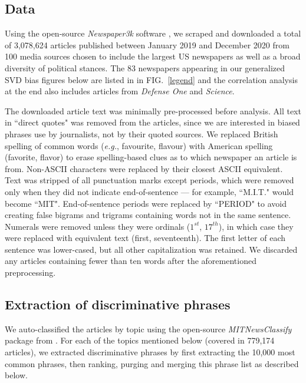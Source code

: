 \documentclass[10pt,letterpaper]{article}
\def\eg{{\frenchspacing\it e.g.}}
\def\fig#1{FIG.~\ref{#1}}
\begin{document}
\label{method}
\subsection*{Data} \label{data}

Using the open-source {\it Newspaper3k} software \cite{ou-yang_newspaper3k_nodate}, we scraped and downloaded a total of 3,078,624 articles published between January 2019 and December 2020 from 100 media sources chosen to include the largest US newspapers as well as a broad diversity of political stances.
The 83 newspapers appearing in our generalized SVD bias figures below are listed in in \fig{legend} and the correlation analysis at the end also includes articles from {\it Defense One} and {\it Science}. 


The downloaded article text was minimally pre-processed before analysis. 
All text in ``direct quotes" was removed from the articles, since we are interested in biased phrases use by journalists, not by their quoted sources. We replaced British spelling of common words (\eg, favourite, flavour) with  American spelling (favorite, flavor) to erase spelling-based clues as to which newspaper an article is from.
Non-ASCII characters were replaced by their closest ASCII equivalent.  
Text was stripped of all punctuation marks except periods, which were removed only when they did not indicate end-of-sentence --- for example,  ``M.I.T." would become ``MIT". End-of-sentence periods were replaced by ``PERIOD" to avoid creating false bigrams and trigrams containing words not in the same sentence.
Numerals were removed unless they were ordinals ($1^{st}$, $17^{th}$), in which case they were replaced with equivalent text (first, seventeenth). The first letter of each sentence was lower-cased, but all other capitalization was retained. 
 We discarded any articles containing fewer than ten words after the aforementioned preprocessing.

\subsection*{Extraction of discriminative phrases}

We auto-classified the articles by topic using the open-source {\it MITNewsClassify} package from \cite{wongprommoon_mit-news-classify_nodate}. For each of the topics mentioned below (covered in 779,174 articles), we extracted discriminative phrases by
 first extracting the 10,000 most common phrases, then ranking, purging and merging this phrase list as described below.
\end{document}
